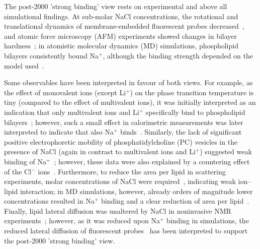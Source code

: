 \documentclass[twoside,twocolumn,9pt]{article}
\begin{document}
The post-2000 'strong binding' view rests on experimental and above all simulational findings.
At sub-molar NaCl concentrations, the rotational and translational dynamics of membrane-embedded fluorescent probes decreased~\cite{bockmann03,vacha09a,harb13}, and atomic force microscopy (AFM) experiments showed changes in bilayer hardness~\cite{manyes05,manyes06,fukuma07,ferber11,morata12};
in atomistic molecular dynamics (MD) simulations, phospholipid bilayers consistently bound Na${^+}$,
although the binding strength depended on the model used~\cite{bockmann03,bockmann04,sachs04,berkowitz06,cordomi08,cordomi09,valley11,berkowitz12}.

Some observables have been interpreted in favour of both views. For example,
as the effect of monovalent ions (except Li$^+$)  on the phase transition temperature is tiny
(compared to the effect of multivalent ions), it was initially interpreted 
as an indication that only multivalent ions and Li$^+$ specifically bind to phospholipid bilayers~\cite{cevc90}; 
however, such a small effect in calorimetric measurements was later interpreted to indicate that also
Na$^+$ binds~\cite{bockmann03,klasczyk10}.
Similarly, the lack of significant positive electrophoretic mobility
of phosphatidylcholine (PC) vesicles in the presence of NaCl
(again in contrast to multivalent ions and Li$^+$)
suggested weak binding of Na$^+$~\cite{eisenberg79,tatulian87,manyes05,manyes06,klasczyk10};
however, these data were also explained by a countering effect of the Cl$^-$ ions~\cite{berkowitz06,knecht13}.
Furthermore, to reduce the area per lipid in scattering experiments, molar concentrations of NaCl were required~\cite{pabst07}, indicating weak ion--lipid interaction;
in MD simulations, however, already orders of magnitude lower concentrations resulted in Na$^+$ binding and a clear reduction of area per lipid~\cite{bockmann03,cordomi08}.
Finally, lipid lateral diffusion was unaltered by NaCl in noninvasive NMR experiments~\cite{filippov09};
however, as it was reduced upon Na$^+$ binding in simulations,
the reduced lateral diffusion of fluorescent probes~\cite{bockmann03,vacha09a,harb13}
has been interpreted to support the post-2000 'strong binding' view.
\end{document}
